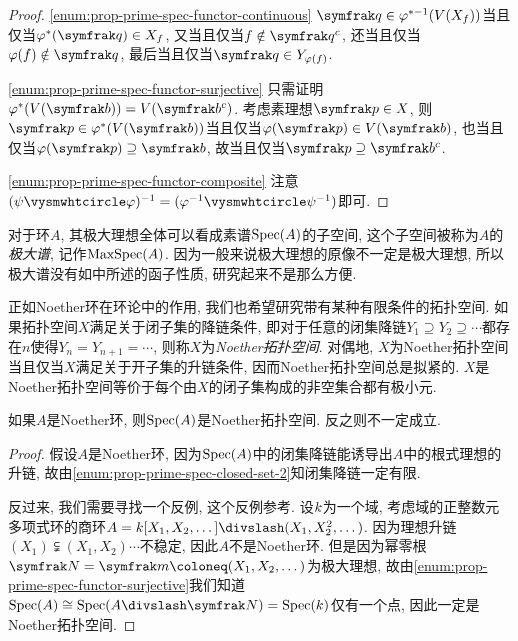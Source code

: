 \begin{proof}
  \ref{enum:prop-prime-spec-functor-continuous} $\ideal{q}\in\varphi^{*-1}(V(X_f))$当且仅当$\varphi^*(\ideal{q})\in X_f$, 又当且仅当$f\notin \ideal{q}^c$, 还当且仅当$\varphi (f)\notin \ideal{q}$, 最后当且仅当$\ideal{q}\in Y_{\varphi (f)}$.

  \ref{enum:prop-prime-spec-functor-surjective} 只需证明$\varphi^*(V(\ideal{b}))=V(\ideal{b}^c)$. 考虑素理想$\ideal{p}\in X$, 则$\ideal{p}\in\varphi^*(V(\ideal{b}))$当且仅当$\varphi(\ideal{p})\in V(\ideal{b})$, 也当且仅当$\varphi(\ideal{p})\supseteq\ideal{b}$, 故当且仅当$\ideal{p}\supseteq\ideal{b}^c$.

  \ref{enum:prop-prime-spec-functor-composite} 注意$(\psi\composite\varphi)^{-1}=(\varphi^{-1}\composite\psi^{-1})$即可.
\end{proof}

对于环$A$, 其极大理想全体可以看成素谱$\operatorname{Spec} (A)$的子空间, 这个子空间被称为$A$的\emph{极大谱}, 记作$\operatorname{MaxSpec} (A)$. 因为一般来说极大理想的原像不一定是极大理想, 所以极大谱没有如中所述的函子性质, 研究起来不是那么方便.

正如Noether环在环论中的作用, 我们也希望研究带有某种有限条件的拓扑空间. 如果拓扑空间$X$满足关于闭子集的降链条件, 即对于任意的闭集降链$Y_1\supseteq Y_2\supseteq\dotsb$都存在$n$使得$Y_n=Y_{n+1}=\dotsb$, 则称$X$为\emph{Noether拓扑空间}. 对偶地, $X$为Noether拓扑空间当且仅当$X$满足关于开子集的升链条件, 因而Noether拓扑空间总是拟紧的. $X$是Noether拓扑空间等价于每个由$X$的闭子集构成的非空集合都有极小元.

\begin{proposition}
  如果$A$是Noether环, 则$\operatorname{Spec} (A)$是Noether拓扑空间. 反之则不一定成立.
\end{proposition}

\begin{proof}
  假设$A$是Noether环, 因为$\operatorname{Spec} (A)$中的闭集降链能诱导出$A$中的根式理想的升链, 故由\ref{enum:prop-prime-spec-closed-set-2}知闭集降链一定有限.

  反过来, 我们需要寻找一个反例, 这个反例参考. 设$k$为一个域, 考虑域的正整数元多项式环的商环$A=\kk [X_1, X_2, \dotsc]{\divslash}(X_1, X_2^2, \dotsc)$. 因为理想升链$(X_1)\subsetneqq (X_1, X_2)\dotsb$不稳定, 因此$A$不是Noether环. 但是因为幂零根$\nil=\ideal{m}\coloneq (X_1, X_2, \dotsc)$为极大理想, 故由\ref{enum:prop-prime-spec-functor-surjective}我们知道$\Spec (A)\cong\Spec (A{\divslash}\nil)=\Spec (\kk)$仅有一个点, 因此一定是Noether拓扑空间.
\end{proof}

